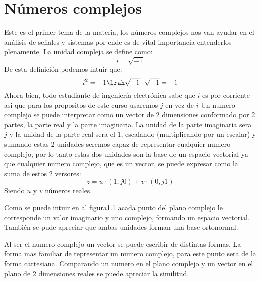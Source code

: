 \chapter{Números complejos}
Este es el primer tema de la materia, los números complejos nos van ayudar en el análisis de señales y sistemas por ende es de vital importancia entenderlos plenamente.
La unidad compleja se define como:
\begin{equation}\label{eq:j}
    i=\sqrt{-1}
\end{equation}{}
De esta definición podemos intuir que:
\begin{equation}\label{eq:jj}
    i^2=-1 \lrah \sqrt{-1}\cdot\sqrt{-1}=-1 
\end{equation}{}
Ahora bien, todo estudiante de ingeniería electrónica sabe que $i$ es por corriente asi que para los propositos de este curso usaremos $j$ en vez de $i$ 
Un numero complejo se puede interpretar como un vector de 2 dimensiones conformado por 2 partes, la parte real y la parte imaginaria. La unidad de la parte imaginaria sera $j$ y la unidad de la parte real sera el $1$, escalando (multiplicando por un escalar) y sumando estas 2 unidades seremos capaz de representar cualquier numero complejo, por lo tanto estas dos unidades son la base de un espacio vectorial ya que cualquier numero complejo, que es un vector, se puede expresar como la suma de estos 2 versores:
\begin{equation}\label{eq:cart}
    z=u\cdot(1,j0)+v\cdot (0,j1)
\end{equation}
Siendo $u$ y $v$ números reales.
\begin{figure}[H]
    \centering
        
    \label{fig:EjmNc}
\end{figure}
Como se puede intuir en al figura\ref{fig:EjmNc} acada punto del plano complejo le corresponde un valor imaginario y uno complejo, formando un espacio vectorial. También se pude apreciar que ambas unidades forman una base ortonormal.

Al ser el numero complejo un vector se puede escribir de distintas formas. La forma mas familiar de representar un numero complejo, para este punto sera de la forma cartesiana. Comparando un numero en el plano complejo y un vector en el plano de 2 dimensiones reales se puede apreciar la similitud.

